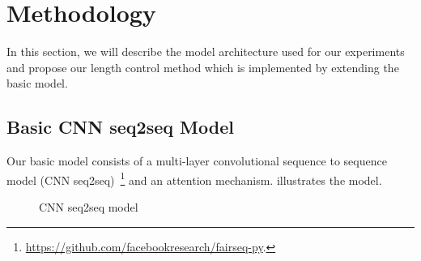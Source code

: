 \section{Methodology}
\label{sec:approach}

In this section, we will describe the model architecture used for our experiments
and propose our length control method which is implemented by extending the 
basic model.

\subsection{Basic CNN seq2seq Model}

Our basic model consists of a multi-layer convolutional sequence to sequence model (CNN seq2seq)~\footnote{\url{https://github.com/facebookresearch/fairseq-py}.} \cite{gehring2017convs2s,CunBDHHHJ89}
and an attention mechanism. %
 illustrates the model.

\begin{figure}[th!]
\centering
{}
\caption{CNN seq2seq model} \label{fig:cnn}
\end{figure}

